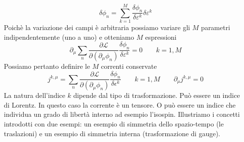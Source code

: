 $$
\delta\phi_n = \sum_{k=1}^M \frac{\delta\phi_n}{\delta\varepsilon^k} \delta\varepsilon^k
$$
Poichè la variazione dei campi è arbitraria possiamo variare gli $M$ parametri indipendentemente (uno a uno) e otteniamo $M$ espressioni
$$
\partial_\mu \sum_n \frac{\partial\mathcal{L}}{\partial(\partial_\mu\phi_n)} \frac{\delta\phi_n}{\delta\varepsilon^k} = 0 \qquad k = 1,M
$$
Possiamo pertanto definire le $M$ correnti conservate
$$
j^{k,\mu} = \sum_n \frac{\partial\mathcal{L}}{\partial(\partial_\mu\phi_n)} \frac{\delta\phi_n}{\delta\epsilon^k} \qquad k = 1,M \qquad \partial_\mu j^{k,\mu} = 0
$$
La natura dell'indice $k$ dipende dal tipo di trasformazione. Può essere un indice di Lorentz. In questo caso la corrente è un tensore. O può essere un indice che individua un grado di libertà interno ad esempio l'isospin. Illustriamo i concetti introdotti con due esempi: un esempio di simmetria dello spazio-tempo (le traslazioni) e un esempio di simmetria interna (trasformazione di gauge).
